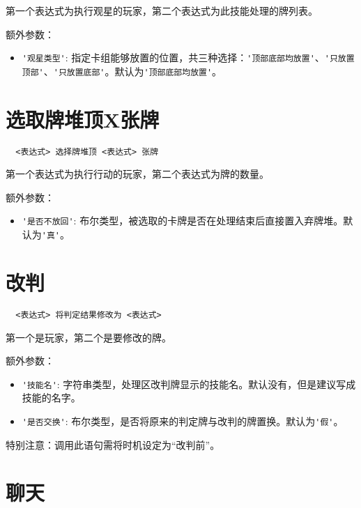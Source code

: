 第一个表达式为执行观星的玩家，第二个表达式为此技能处理的牌列表。

额外参数：

\begin{itemize}
  \item \verb|'观星类型'|: 指定卡组能够放置的位置，共三种选择：\verb|'顶部底部均放置'|、\verb|'只放置顶部'|、\verb|'只放置底部'|。默认为\verb|'顶部底部均放置'|。
\end{itemize}

\section{选取牌堆顶X张牌}

\begin{verbatim}
  <表达式> 选择牌堆顶 <表达式> 张牌
\end{verbatim}

第一个表达式为执行行动的玩家，第二个表达式为牌的数量。

额外参数：

\begin{itemize}
  \item \verb|'是否不放回'|: 布尔类型，被选取的卡牌是否在处理结束后直接置入弃牌堆。默认为\verb|'真'|。
\end{itemize}

\section{改判}

\begin{verbatim}
  <表达式> 将判定结果修改为 <表达式>
\end{verbatim}

第一个是玩家，第二个是要修改的牌。

额外参数：

\begin{itemize}
  \item \verb|'技能名'|: 字符串类型，处理区改判牌显示的技能名。默认没有，但是建议写成技能的名字。
  \item \verb|'是否交换'|: 布尔类型，是否将原来的判定牌与改判的牌置换。默认为\verb|'假'|。
\end{itemize}

特别注意：调用此语句需将时机设定为“改判前”。

\section{聊天}

